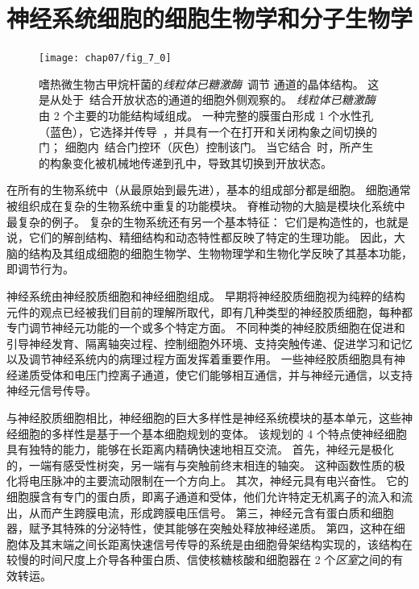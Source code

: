 \part{神经系统细胞的细胞生物学和分子生物学}

\begin{figure}[htbp]
	\centering
	\texttt{[image: chap07/fig\_7\_0]}
	\caption{嗜热微生物古甲烷杆菌的\textit{线粒体已糖激酶}~调节 通道的晶体结构。
		这是从处于~结合开放状态的通道的细胞外侧观察的。
		\textit{线粒体已糖激酶}由 2 个主要的功能结构域组成。
		一种完整的膜蛋白形成 1 个水性孔（蓝色），它选择并传导~，并具有一个在打开和关闭构象之间切换的门；
		细胞内~结合门控环（灰色）控制该门。
		当它结合~时，所产生的构象变化被机械地传递到孔中，导致其切换到开放状态。}
	\label{fig:7_0}
\end{figure}





在所有的生物系统中（从最原始到最先进），基本的组成部分都是细胞。
细胞通常被组织成在复杂的生物系统中重复的功能模块。
脊椎动物的大脑是模块化系统中最复杂的例子。
复杂的生物系统还有另一个基本特征：
它们是构造性的，也就是说，它们的解剖结构、精细结构和动态特性都反映了特定的生理功能。
因此，大脑的结构及其组成细胞的细胞生物学、生物物理学和生物化学反映了其基本功能，即调节行为。


神经系统由神经胶质细胞和神经细胞组成。
早期将神经胶质细胞视为纯粹的结构元件的观点已经被我们目前的理解所取代，即有几种类型的神经胶质细胞，每种都专门调节神经元功能的一个或多个特定方面。
不同种类的神经胶质细胞在促进和引导神经发育、隔离轴突过程、控制细胞外环境、支持突触传递、促进学习和记忆以及调节神经系统内的病理过程方面发挥着重要作用。
一些神经胶质细胞具有神经递质受体和电压门控离子通道，使它们能够相互通信，并与神经元通信，以支持神经元信号传导。


与神经胶质细胞相比，神经细胞的巨大多样性是神经系统模块的基本单元，这些神经细胞的多样性是基于一个基本细胞规划的变体。
该规划的 4 个特点使神经细胞具有独特的能力，能够在长距离内精确快速地相互交流。
首先，神经元是极化的，一端有感受性树突，另一端有与突触前终末相连的轴突。
这种函数性质的极化将电压脉冲的主要流动限制在一个方向上。
其次，神经元具有电兴奋性。
它的细胞膜含有专门的蛋白质，即离子通道和受体，他们允许特定无机离子的流入和流出，从而产生跨膜电流，形成跨膜电压信号。
第三，神经元含有蛋白质和细胞器，赋予其特殊的分泌特性，使其能够在突触处释放神经递质。
第四，这种在细胞体及其末端之间长距离快速信号传导的系统是由细胞骨架结构实现的，该结构在较慢的时间尺度上介导各种蛋白质、信使核糖核酸和细胞器在 2 个\textit{区室}之间的有效转运。


